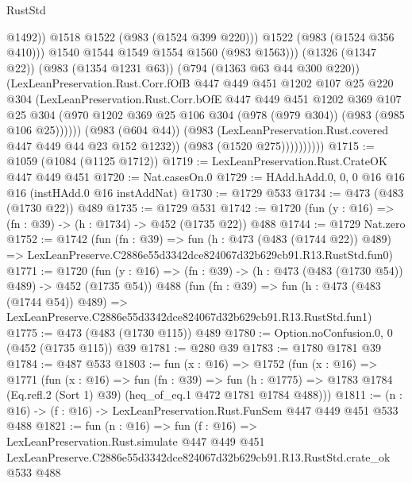\begin{lexlean}{RustStd}
\begin{coremodule}
                                  @1492))
                              @1518
                              @1522
                              (@983 (@1524 @399 @220)))
                            @1522
                            (@983 (@1524 @356 @410)))
                          @1540
                          @1544
                          @1549
                          @1554
                          @1560
                          (@983 @1563)))
                      (@1326 (@1347 @22))
                      (@983 (@1354 @1231 @63))
                      (@794 (@1363 @63 @44 @300 @220))
                      (LexLeanPreservation.Rust.Corr.fOfB
                        @447
                        @449
                        @451
                        @1202
                        @107
                        @25
                        @220
                        @304
                        (LexLeanPreservation.Rust.Corr.bOfE
                          @447
                          @449
                          @451
                          @1202
                          @369
                          @107
                          @25
                          @304
                          (@970
                            @1202
                            @369
                            @25
                            @106
                            @304
                            (@978 (@979 @304))
                            (@983 (@985 @106 @25))))))
                    (@983 (@604 @44))
                    (@983 (LexLeanPreservation.Rust.covered @447 @449 @44 @23 @152 @1232))
                    (@983 (@1520 @275))))))))))
@1715 := @1059 (@1084 (@1125 @1712))
@1719 := LexLeanPreservation.Rust.CrateOK @447 @449 @451
@1720 := Nat.casesOn.{0}
@1729 := HAdd.hAdd.{0, 0, 0} @16 @16 @16 (instHAdd.{0} @16 instAddNat)
@1730 := @1729 @533
@1734 := @473 (@483 (@1730 @22)) @489
@1735 := @1729 @531
@1742 := @1720 (fun (y : @16) => (fn : @39) -> (h : @1734) -> @452 (@1735 @22)) @488
@1744 := @1729 Nat.zero
@1752 := @1742
    (fun (fn : @39) =>
    fun (h : @473 (@483 (@1744 @22)) @489) =>
    LexLeanPreserve.C2886e55d3342dce824067d32b629cb91.R13.RustStd.fun0)
@1771 := @1720
    (fun (y : @16) => (fn : @39) -> (h : @473 (@483 (@1730 @54)) @489) -> @452 (@1735 @54))
    @488
    (fun (fn : @39) =>
    fun (h : @473 (@483 (@1744 @54)) @489) =>
    LexLeanPreserve.C2886e55d3342dce824067d32b629cb91.R13.RustStd.fun1)
@1775 := @473 (@483 (@1730 @115)) @489
@1780 := Option.noConfusion.{0, 0} (@452 (@1735 @115)) @39
@1781 := @280 @39
@1783 := @1780 @1781 @39
@1784 := @487 @533
@1803 := fun (x : @16) =>
  @1752
    (fun (x : @16) =>
    @1771
      (fun (x : @16) =>
      fun (fn : @39) =>
      fun (h : @1775) =>
      @1783 @1784 (Eq.refl.{2} (Sort 1) @39) (heq_of_eq.{1} @472 @1781 @1784 @488)))
@1811 := (n : @16) -> (f : @16) -> LexLeanPreservation.Rust.FunSem @447 @449 @451 @533 @488
@1821 := fun (n : @16) =>
  fun (f : @16) =>
  LexLeanPreservation.Rust.simulate
    @447
    @449
    @451
    LexLeanPreserve.C2886e55d3342dce824067d32b629cb91.R13.RustStd.crate_ok
    @533
    @488
\end{coremodule}
\end{lexlean}
